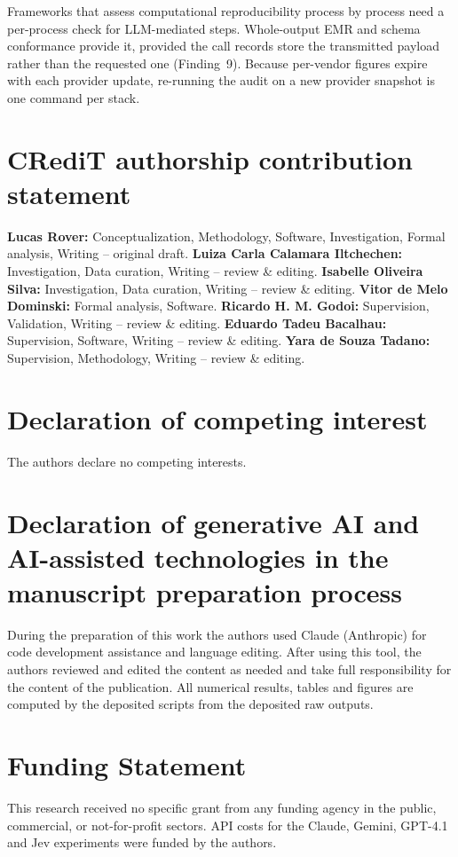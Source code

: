 \documentclass[preprint,review,12pt,authoryear]{elsarticle}
\begin{document}
Frameworks that assess computational reproducibility process by process \citep{zhu2025geosimulation} need a per-process check for LLM-mediated steps. Whole-output EMR and schema conformance provide it, provided the call records store the transmitted payload rather than the requested one (Finding~9). Because per-vendor figures expire with each provider update, re-running the audit on a new provider snapshot is one command per stack.



\section*{CRediT authorship contribution statement}
\textbf{Lucas Rover:} Conceptualization, Methodology, Software, Investigation, Formal analysis, Writing -- original draft.
\textbf{Luiza Carla Calamara Iltchechen:} Investigation, Data curation, Writing -- review \& editing.
\textbf{Isabelle Oliveira Silva:} Investigation, Data curation, Writing -- review \& editing.
\textbf{Vitor de Melo Dominski:} Formal analysis, Software.
\textbf{Ricardo H. M. Godoi:} Supervision, Validation, Writing -- review \& editing.
\textbf{Eduardo Tadeu Bacalhau:} Supervision, Software, Writing -- review \& editing.
\textbf{Yara de Souza Tadano:} Supervision, Methodology, Writing -- review \& editing.

\section*{Declaration of competing interest}
The authors declare no competing interests.

\section*{Declaration of generative AI and AI-assisted technologies in the manuscript preparation process}
During the preparation of this work the authors used Claude (Anthropic) for code development assistance and language editing. After using this tool, the authors reviewed and edited the content as needed and take full responsibility for the content of the publication. All numerical results, tables and figures are computed by the deposited scripts from the deposited raw outputs.

\section*{Funding Statement}
This research received no specific grant from any funding agency in the public, commercial, or not-for-profit sectors.
API costs for the Claude, Gemini, GPT-4.1 and Jev experiments were funded by the authors.
\end{document}
